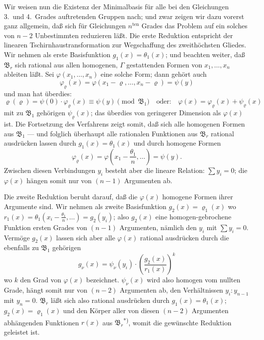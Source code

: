 \documentclass[12pt,a4paper]{article}
\begin{document}
Wir weisen nun die Existenz der Minimalbasis f\"ur alle bei den Gleichungen 3.\ und 4.\ Grades auftretenden Gruppen nach; und zwar zeigen wir dazu vorerst ganz allgemein, da\ss{} sich f\"ur Gleichungen $n^{\mathrm{ten}}$ Grades das Problem auf ein solches von $n-2$ Unbestimmten reduzieren l\"a\ss{}t. Die erste Reduktion entspricht der linearen Tschirnhaustransformation zur Wegschaffung des zweith\"ochsten Gliedes. Wir nehmen als erste Basisfunktion $g_{1}(x)=\theta_{1}(x)$; und beachten weiter, da\ss{} $\mathfrak{B}_{r}$ sich rational aus allen homogenen, $\Gamma$ gestattenden Formen von $x_{1},\ldots,x_{n}$ ableiten l\"a\ss{}t. Sei $\varphi(x_{1},\ldots,x_{n})$ eine solche Form; dann geh\"ort auch
\[
\varphi_{\varrho}(x)=\varphi(x_{1}-\varrho,\ldots,x_{n}-\varrho)=\psi(y)
\]
und man hat \"uberdies:
\[
\varrho(\varrho)=\psi(0)\cdot\varphi_{\varrho}(x)\equiv\psi(y)\pmod{\mathfrak{B}_{1}}
\quad\text{oder:}\quad
\varphi(x)=\varphi_{\varrho}(x)+\psi_{\varrho}(x)
\]
mit zu $\mathfrak{B}_{1}$ geh\"origen $\psi_{\varrho}(x)$; das \"uberdies von geringerer Dimension als $\varphi(x)$ ist. Die Fortsetzung des Verfahrens zeigt somit, da\ss{} sich alle homogenen Formen aus $\mathfrak{B}_{1}$ --- und folglich \"uberhaupt alle rationalen Funktionen aus $\mathfrak{B}_{r}$ rational ausdr\"ucken lassen durch $g_{1}(x)=\theta_{1}(x)$ und durch homogene Formen
\[
\varphi_{\varrho}(x)=\varphi\left(x_{1}-\frac{\theta_{1}}{n},\ldots\right)=\psi(y).
\]
Zwischen diesen Verbindungen $y_{i}$ besteht aber die lineare Relation: $\sum y_{i}=0$; die $\varphi(x)$ h\"angen somit nur von $(n-1)$ Argumenten ab.

Die zweite Reduktion beruht darauf, da\ss{} die $\varphi(x)$ homogene Formen ihrer Argumente sind. Wir nehmen als zweite Basisfunktion $g_{2}(x)=\varrho_{1}(x)$ wo $r_{1}(x)=\theta_{1}(x_{i}-\frac{\theta_{1}}{n},\ldots)=g_{2}(y_{i})$; also $g_{2}(x)$ eine homogen-gebrochene Funktion ersten Grades von $(n-1)$ Argumenten, n\"amlich den $y_{i}$ mit $\sum y_{i}=0$. Verm\"oge $g_{2}(x)$ lassen sich aber alle $\varphi(x)$ rational ausdr\"ucken durch die ebenfalls zu $\mathfrak{B}_{1}$ geh\"origen
\[
g_{\nu}(x)=\psi_{\nu}(y_{i})\cdot\left(\frac{g_{2}(x)}{r_{1}(x)}\right)^{k}
\]
wo $k$ den Grad von $\varphi(x)$ bezeichnet. $\psi_{\nu}(x)$ wird also homogen vom nullten Grade, h\"angt somit nur von $(n-2)$ Argumenten ab, den Verh\"altnissen $y_{i}:y_{n-1}$ mit $y_{n}=0$. $\mathfrak{B}_{r}$ l\"a\ss{}t sich also rational ausdr\"ucken durch $g_{1}(x)=\theta_{1}(x)$; $g_{2}(x)=\varrho_{1}(x)$ und den K\"orper aller von diesen $(n-2)$ Argumenten abh\"angenden Funktionen $r(x)$ aus $\mathfrak{B}_{r}$\textsuperscript{*)}, womit die gew\"unschte Reduktion geleistet ist.
\end{document}
